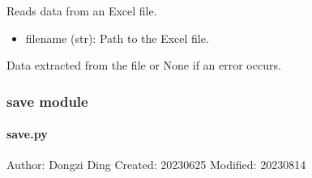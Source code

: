 \documentclass[a4paper,10pt,english]{sphinxmanual}
\begin{document}

\begin{fulllineitems}
\label{\detokenize{utils:src.utils.regression_analysis.read_data}}
\pysigstartsignatures
{}
\pysigstopsignatures
\sphinxAtStartPar
Reads data from an Excel file.
\begin{description}
\begin{itemize}
\item {} 
\sphinxAtStartPar
filename (str): Path to the Excel file.

\end{itemize}

\sphinxAtStartPar
Data extracted from the file or None if an error occurs.

\end{description}

\end{fulllineitems}



\subsubsection{save module}
\label{\detokenize{utils:module-src.utils.save}}\label{\detokenize{utils:save-module}}

\paragraph{save.py}
\label{\detokenize{utils:save-py}}
\sphinxAtStartPar
Author: Dongzi Ding
Created: 2023\sphinxhyphen{}06\sphinxhyphen{}25
Modified: 2023\sphinxhyphen{}08\sphinxhyphen{}14
\end{document}
